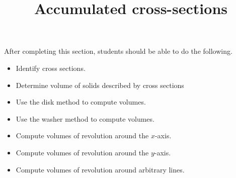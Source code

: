 \documentclass{ximera}
\title{Accumulated cross-sections}
\begin{document}
\begin{abstract}
\end{abstract}

\maketitle

\begin{sectionOutcomes}

After completing this section, students should be able to do the following.

\begin{itemize}
\item Identify cross sections.
\item Determine volume of solids described by cross sections
\item Use the disk method to compute volumes.
\item Use the washer method to compute volumes.
\item Compute volumes of revolution around the $x$-axis.
\item Compute volumes of revolution around the $y$-axis.
\item Compute volumes of revolution around arbitrary lines.
\end{itemize}

\end{sectionOutcomes}
\end{document}
